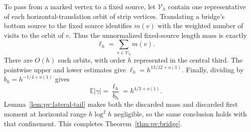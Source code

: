 To pass from a marked vertex to a fixed source, let $\mathcal V_h$
contain one representative of each horizontal-translation orbit of
strip vertices. Translating a bridge's bottom source to the fixed
source identifies $m(v)$ with the weighted number of visits to the
orbit of $v$. Thus the unnormalized fixed-source length mass is
exactly
\[
 \ell_h=\sum_{v\in\mathcal V_h}m(v).
\]
There are $O(h)$ such orbits, with order $h$ represented in the
central third. The pointwise upper and lower estimates give
$\ell_h=h^{13/12+o(1)}$. Finally, dividing by
$b_h=h^{-1/4+o(1)}$ gives
\[
 \mathbb E|\gamma|=\frac{\ell_h}{b_h}=h^{4/3+o(1)}.
\]
Lemma~\ref{lem:pv:lateral-tail} makes both the discarded mass and
discarded first moment at horizontal range $h\log^2h$ negligible,
so the same conclusion holds with that confinement. This completes
Theorem~\ref{thm:pv:bridge}.
